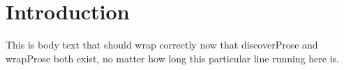 \section{Introduction}

This is body text that should wrap
correctly now that discoverProse and
wrapProse both exist, no matter how long
this particular line running here is.


